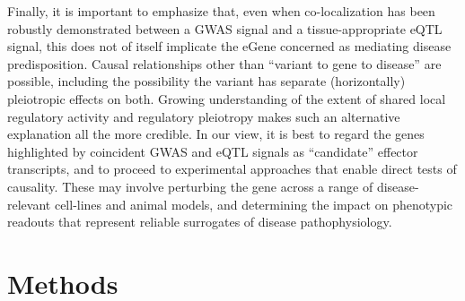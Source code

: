 Finally, it is important to emphasize that, even when co-localization has been robustly demonstrated between a GWAS signal and a tissue-appropriate eQTL signal, this does not of itself implicate the eGene concerned as mediating disease predisposition. Causal relationships other than “variant to gene to disease” are possible, including the possibility the variant has separate (horizontally) pleiotropic effects on both. Growing understanding of the extent of shared local regulatory activity and regulatory pleiotropy makes such an alternative explanation all the more credible. In our view, it is best to regard the genes highlighted by coincident GWAS and eQTL signals as “candidate” effector transcripts, and to proceed to experimental approaches that enable direct tests of causality. These may involve perturbing the gene across a range of disease-relevant cell-lines and animal models, and determining the impact on phenotypic readouts that represent reliable surrogates of disease pathophysiology. 



\section{Methods}

